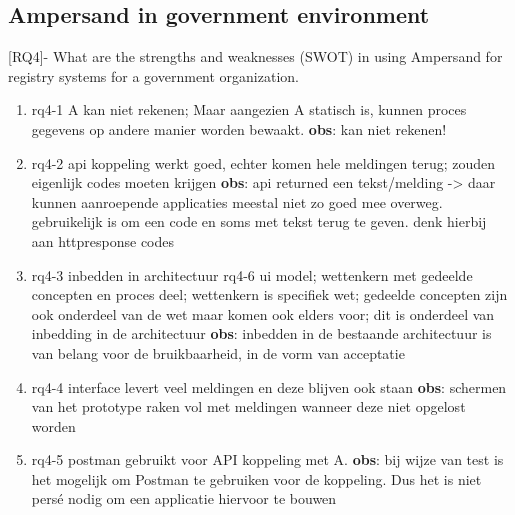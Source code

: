 \begin{comment}
RQ4 - Wat zijn de sterke en zwakke punten (SWOT) bij het gebruik van Ampersand voor registratiesystemen voor een overheidsorganisatie.
\end{comment}

\subsection{Ampersand in government environment}
[RQ4]- What are the strengths and weaknesses (SWOT) in using Ampersand for registry systems for a government organization.
\begin{enumerate}
    \item rq4-1 A kan niet rekenen; Maar aangezien A statisch is, kunnen proces gegevens op andere manier worden bewaakt.
    \newline\textbf{obs}: kan niet rekenen!
    
    \item rq4-2 api koppeling werkt goed, echter komen hele meldingen terug; zouden eigenlijk codes moeten krijgen 
    \newline\textbf{obs}: api returned een tekst/melding -> daar kunnen aanroepende applicaties meestal niet zo goed mee overweg. 
    gebruikelijk is om een code en soms met tekst terug te geven. 
    denk hierbij aan httpresponse codes
    
    \item rq4-3 inbedden in architectuur 
    \newline rq4-6 ui model; 
    wettenkern met gedeelde concepten en proces deel; 
    wettenkern is specifiek wet; 
    gedeelde concepten zijn ook onderdeel van de wet maar komen ook elders voor;
    dit is onderdeel van inbedding in de architectuur
    \newline\textbf{obs}: inbedden in de bestaande architectuur is van belang voor de bruikbaarheid, in de vorm van acceptatie
    
    \item rq4-4 interface levert veel meldingen en deze blijven ook staan
    \newline\textbf{obs}: schermen van het prototype raken vol met meldingen wanneer deze niet opgelost worden
    
    \item rq4-5 postman gebruikt voor API koppeling met A. 
    \newline\textbf{obs}: bij wijze van test is het mogelijk om Postman te gebruiken voor de koppeling. 
    Dus het is niet persé nodig om een applicatie hiervoor te bouwen
    

\end{enumerate}
